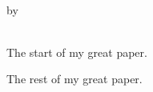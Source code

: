 \documentclass{biosmasters}
\makeatletter
\let\thetitle\@title
\let\theauthor\@author
\makeatother
\begin{document}

\doublespacing

\thispagestyle{firstpage}

\begin{center}
\thetitle \\[1cm]
by \\[1cm]
\theauthor \\
\end{center}
\vspace{1.1cm}

The start of my great paper.

\restoregeometry
\doublespacing

The rest of my great paper.

\end{document}

